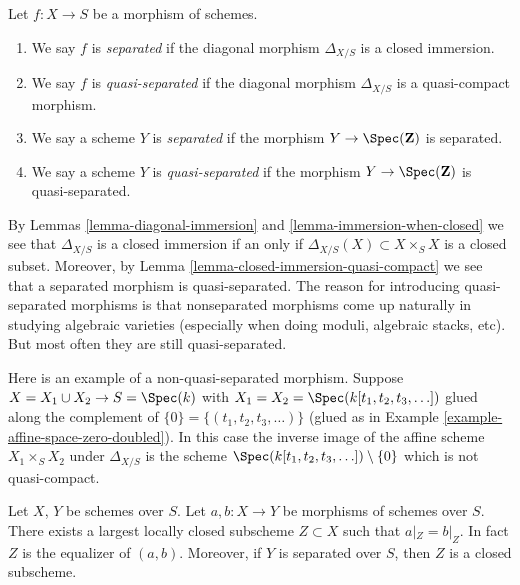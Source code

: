 \begin{definition}
\label{definition-separated}
Let $f : X \to S$ be a morphism of schemes.
\begin{enumerate}
\item We say $f$ is {\it separated} if the diagonal morphism $\Delta_{X/S}$
is a closed immersion.
\item We say $f$ is {\it quasi-separated} if the diagonal morphism
$\Delta_{X/S}$ is a quasi-compact morphism.
\item We say a scheme $Y$ is {\it separated} if the morphism
$Y \to \Spec(\mathbf{Z})$ is separated.
\item We say a scheme $Y$ is {\it quasi-separated} if the morphism
$Y \to \Spec(\mathbf{Z})$ is quasi-separated.
\end{enumerate}
\end{definition}

\noindent
By Lemmas \ref{lemma-diagonal-immersion} and \ref{lemma-immersion-when-closed}
we see that $\Delta_{X/S}$ is a closed immersion if an only if
$\Delta_{X/S}(X) \subset X \times_S X$ is a closed subset. Moreover,
by Lemma \ref{lemma-closed-immersion-quasi-compact} we see that a
separated morphism is quasi-separated. The reason for introducing
quasi-separated morphisms is that nonseparated morphisms come up naturally
in studying algebraic varieties (especially when doing moduli,
algebraic stacks, etc). But most often they are still quasi-separated.

\begin{example}
\label{example-not-quasi-separated}
Here is an example of a non-quasi-separated morphism.
Suppose $X = X_1 \cup X_2 \to S = \Spec(k)$ with
$X_1 = X_2 = \Spec(k[t_1, t_2, t_3, \ldots])$
glued along the complement of $\{0\} = \{(t_1, t_2, t_3, \ldots)\}$
(glued as in Example \ref{example-affine-space-zero-doubled}).
In this case the inverse image of the affine scheme
$X_1 \times_S X_2$ under $\Delta_{X/S}$ is the scheme
$\Spec(k[t_1, t_2, t_3, \ldots]) \setminus \{0\}$
which is not quasi-compact.
\end{example}

\begin{lemma}
\label{lemma-where-are-they-equal}
Let $X$, $Y$ be schemes over $S$.
Let $a, b : X \to Y$ be morphisms of schemes over $S$.
There exists a largest locally closed subscheme
$Z \subset X$ such that $a|_Z = b|_Z$. In fact $Z$ is
the equalizer of $(a, b)$. Moreover, if $Y$ is separated
over $S$, then $Z$ is a closed subscheme.
\end{lemma}

